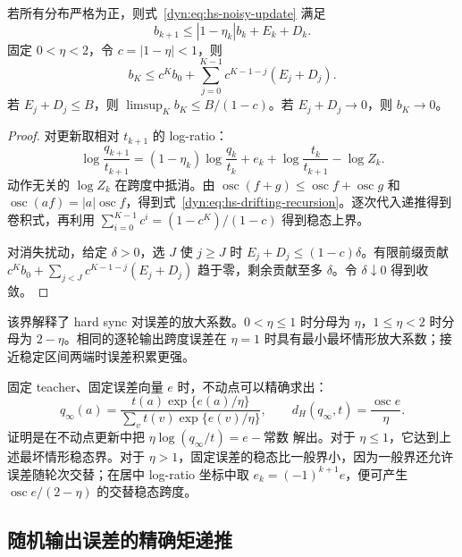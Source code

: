 \documentclass[lang=cn,scheme=chinese,openany]{../book/elegantbook}
\begin{document}
\begin{theorem}\label{dyn:thm:hs-input-state}
若所有分布严格为正，则式~\eqref{dyn:eq:hs-noisy-update} 满足
\begin{equation}\label{dyn:eq:hs-drifting-recursion}
 b_{k+1}\leq |1-\eta_k|b_k+E_k+D_k.
\end{equation}
固定 $0<\eta<2$，令 $c=|1-\eta|<1$，则
\begin{equation*}
 b_K\leq c^K b_0+\sum_{j=0}^{K-1}c^{K-1-j}(E_j+D_j).
\end{equation*}
若 $E_j+D_j\leq B$，则 $\limsup_K b_K\leq B/(1-c)$。若 $E_j+D_j\to0$，则 $b_K\to0$。
\end{theorem}

\begin{proof}
对更新取相对 $t_{k+1}$ 的 log-ratio：
\begin{equation*}
 \log\frac{q_{k+1}}{t_{k+1}}
 =(1-\eta_k)\log\frac{q_k}{t_k}+e_k
       +\log\frac{t_k}{t_{k+1}}-\log Z_k.
\end{equation*}
动作无关的 $\log Z_k$ 在跨度中抵消。由 $\operatorname{osc}(f+g)\leq\operatorname{osc}f+\operatorname{osc}g$ 和 $\operatorname{osc}(af)=|a|\operatorname{osc}f$，得到式~\eqref{dyn:eq:hs-drifting-recursion}。逐次代入递推得到卷积式，再利用 $\sum_{i=0}^{K-1}c^i=(1-c^K)/(1-c)$ 得到稳态上界。

对消失扰动，给定 $\delta>0$，选 $J$ 使 $j\geq J$ 时 $E_j+D_j\leq(1-c)\delta$。有限前缀贡献 $c^Kb_0+\sum_{j<J}c^{K-1-j}(E_j+D_j)$ 趋于零，剩余贡献至多 $\delta$。令 $\delta\downarrow0$ 得到收敛。
\end{proof}

该界解释了 hard sync 对误差的放大系数。$0<\eta\leq1$ 时分母为 $\eta$，$1\leq\eta<2$ 时分母为 $2-\eta$。相同的逐轮输出跨度误差在 $\eta=1$ 时具有最小最坏情形放大系数；接近稳定区间两端时误差积累更强。

固定 teacher、固定误差向量 $e$ 时，不动点可以精确求出：
\begin{equation*}
 q_\infty(a)=\frac{t(a)\exp\{e(a)/\eta\}}
 {\sum_v t(v)\exp\{e(v)/\eta\}},\qquad
 d_H(q_\infty,t)=\frac{\operatorname{osc}e}{\eta}.
\end{equation*}
证明是在不动点更新中把 $\eta\log(q_\infty/t)=e-\text{常数}$ 解出。对于 $\eta\leq1$，它达到上述最坏情形稳态界。对于 $\eta>1$，固定误差的稳态比一般界小，因为一般界还允许误差随轮次交替；在居中 log-ratio 坐标中取 $e_k=(-1)^{k+1}e$，便可产生 $\operatorname{osc}e/(2-\eta)$ 的交替稳态跨度。

\subsection{随机输出误差的精确矩递推}
\end{document}
